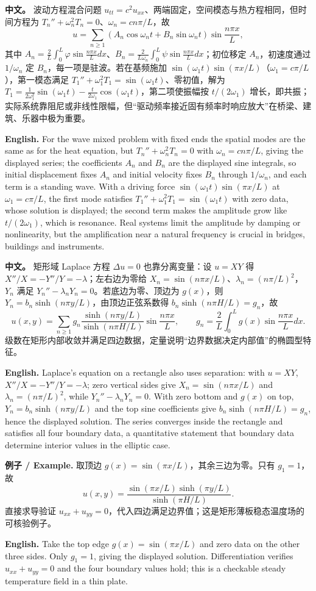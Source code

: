 \documentclass[UTF8,11pt,a4paper]{ctexart}
\newcommand{\EN}[1]{\par\noindent \textbf{English.} #1\par}
\newcommand{\EX}[2]{\par\noindent \textbf{例子 / Example.} #1\par\EN{#2}}
\newcommand{\APS}[2]{\par\noindent\textbf{中文。} #1\par\noindent\textbf{English.} #2\par\smallskip}
\begin{document}
\APS{波动方程混合问题 $u_{tt}=c^2u_{xx}$、两端固定，空间模态与热方程相同，但时间方程为 $T_n''+\omega_n^2T_n=0$、$\omega_n=cn\pi/L$，故
\[
u=\sum_{n\ge1}\left(A_n\cos\omega_nt+B_n\sin\omega_nt\right)\sin\frac{n\pi x}{L},
\]
其中 $A_n=\frac2L\int_0^L\varphi\sin\frac{n\pi x}{L}dx$、$B_n=\frac{2}{L\omega_n}\int_0^L\psi\sin\frac{n\pi x}{L}dx$；初位移定 $A_n$，初速度通过 $1/\omega_n$ 定 $B_n$，每一项是驻波。若在基频施加 $\sin(\omega_1t)\sin(\pi x/L)$（$\omega_1=c\pi/L$），第一模态满足 $T_1''+\omega_1^2T_1=\sin(\omega_1t)$、零初值，解为 $T_1=\frac{1}{2\omega_1^2}\sin(\omega_1t)-\frac{t}{2\omega_1}\cos(\omega_1t)$，第二项使振幅按 $t/(2\omega_1)$ 增长，即共振；实际系统靠阻尼或非线性限幅，但“驱动频率接近固有频率时响应放大”在桥梁、建筑、乐器中极为重要。}{For the wave mixed problem with fixed ends the spatial modes are the same as for the heat equation, but $T_n''+\omega_n^2T_n=0$ with $\omega_n=cn\pi/L$, giving the displayed series; the coefficients $A_n$ and $B_n$ are the displayed sine integrals, so initial displacement fixes $A_n$ and initial velocity fixes $B_n$ through $1/\omega_n$, and each term is a standing wave. With a driving force $\sin(\omega_1t)\sin(\pi x/L)$ at $\omega_1=c\pi/L$, the first mode satisfies $T_1''+\omega_1^2T_1=\sin(\omega_1t)$ with zero data, whose solution is displayed; the second term makes the amplitude grow like $t/(2\omega_1)$, which is resonance. Real systems limit the amplitude by damping or nonlinearity, but the amplification near a natural frequency is crucial in bridges, buildings and instruments.}
\APS{矩形域 Laplace 方程 $\Delta u=0$ 也靠分离变量：设 $u=XY$ 得 $X''/X=-Y''/Y=-\lambda$；左右边为零给 $X_n=\sin(n\pi x/L)$、$\lambda_n=(n\pi/L)^2$，$Y_n$ 满足 $Y_n''-\lambda_nY_n=0$。若底边为零、顶边为 $g(x)$，则 $Y_n=b_n\sinh(n\pi y/L)$，由顶边正弦系数得 $b_n\sinh(n\pi H/L)=g_n$，故
\[
u(x,y)=\sum_{n\ge1}g_n\frac{\sinh(n\pi y/L)}{\sinh(n\pi H/L)}\sin\frac{n\pi x}{L},\qquad g_n=\frac2L\int_0^Lg(x)\sin\frac{n\pi x}{L}dx .
\]
级数在矩形内部收敛并满足四边数据，定量说明“边界数据决定内部值”的椭圆型特征。}{Laplace's equation on a rectangle also uses separation: with $u=XY$, $X''/X=-Y''/Y=-\lambda$; zero vertical sides give $X_n=\sin(n\pi x/L)$ and $\lambda_n=(n\pi/L)^2$, while $Y_n''-\lambda_nY_n=0$. With zero bottom and $g(x)$ on top, $Y_n=b_n\sinh(n\pi y/L)$ and the top sine coefficients give $b_n\sinh(n\pi H/L)=g_n$, hence the displayed solution. The series converges inside the rectangle and satisfies all four boundary data, a quantitative statement that boundary data determine interior values in the elliptic case.}
\EX{取顶边 $g(x)=\sin(\pi x/L)$，其余三边为零。只有 $g_1=1$，故
\[
u(x,y)=\frac{\sin(\pi x/L)\sinh(\pi y/L)}{\sinh(\pi H/L)}.
\]
直接求导验证 $u_{xx}+u_{yy}=0$，代入四边满足边界值；这是矩形薄板稳态温度场的可核验例子。}{Take the top edge $g(x)=\sin(\pi x/L)$ and zero data on the other three sides. Only $g_1=1$, giving the displayed solution. Differentiation verifies $u_{xx}+u_{yy}=0$ and the four boundary values hold; this is a checkable steady temperature field in a thin plate.}
\end{document}
